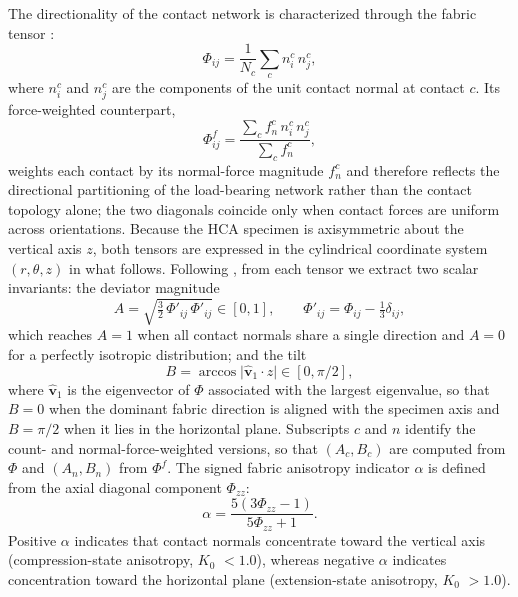 \documentclass[a4paper,fleqn]{cas-sc}
\newcommand{\Kzero}{\ensuremath{K_0}}
\begin{document}
The directionality of the contact network is characterized through the fabric tensor \citep{Oda1982fabric,Oda1982stat}:
\begin{equation}
\Phi_{ij} = \frac{1}{N_c}\sum_c n_i^c\,n_j^c,
\label{eq:fabric_tensor}
\end{equation}
where $n_i^c$ and $n_j^c$ are the components of the unit contact normal at contact $c$. Its force-weighted counterpart,
\begin{equation}
\Phi^f_{ij} = \frac{\sum_c f_n^c\, n_i^c\, n_j^c}{\sum_c f_n^c},
\label{eq:fabric_tensor_force}
\end{equation}
weights each contact by its normal-force magnitude $f_n^c$ and therefore reflects the directional partitioning of the load-bearing network rather than the contact topology alone; the two diagonals coincide only when contact forces are uniform across orientations. Because the HCA specimen is axisymmetric about the vertical axis $z$, both tensors are expressed in the cylindrical coordinate system $(r,\theta,z)$ in what follows. Following \citet{Zhou2022,Song2024}, from each tensor we extract two scalar invariants: the deviator magnitude
\begin{equation}
A = \sqrt{\tfrac{3}{2}\,\Phi'_{ij}\,\Phi'_{ij}} \in [0,1],
\qquad
\Phi'_{ij} = \Phi_{ij} - \tfrac{1}{3}\delta_{ij},
\label{eq:fabric_invariants}
\end{equation}
which reaches $A = 1$ when all contact normals share a single direction and $A = 0$ for a perfectly isotropic distribution; and the tilt
\begin{equation}
B = \arccos\bigl|\hat{\bm v}_1 \cdot \hat{z}\bigr| \in [0, \pi/2],
\label{eq:fabric_tilt}
\end{equation}
where $\hat{\bm v}_1$ is the eigenvector of $\Phi$ associated with the largest eigenvalue, so that $B = 0$ when the dominant fabric direction is aligned with the specimen axis and $B = \pi/2$ when it lies in the horizontal plane. Subscripts $c$ and $n$ identify the count- and normal-force-weighted versions, so that $(A_c, B_c)$ are computed from $\Phi$ and $(A_n, B_n)$ from $\Phi^f$. The signed fabric anisotropy indicator $\alpha$ \citep{YimsiriSoga2010,Otsubo2022} is defined from the axial diagonal component $\Phi_{zz}$:
\begin{equation}
\alpha = \frac{5(3\Phi_{zz} - 1)}{5\Phi_{zz} + 1}.
\label{eq:alpha_definition_method}
\end{equation}
Positive $\alpha$ indicates that contact normals concentrate toward the vertical axis (compression-state anisotropy, \Kzero{} $< 1.0$), whereas negative $\alpha$ indicates concentration toward the horizontal plane (extension-state anisotropy, \Kzero{} $> 1.0$).
\end{document}
